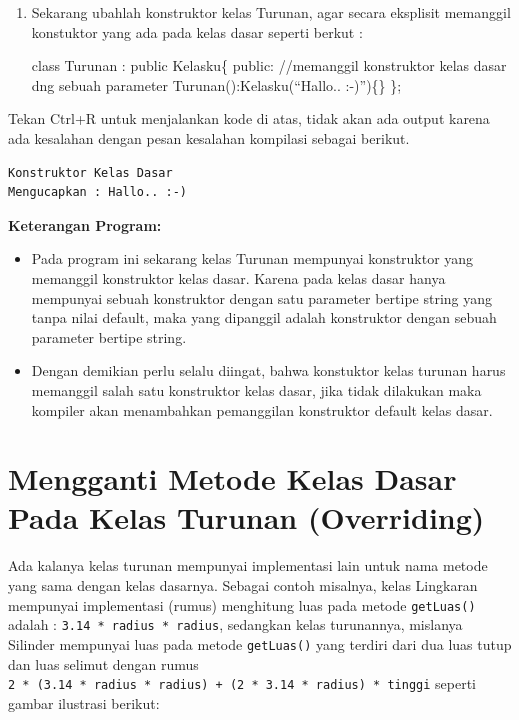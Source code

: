 \begin{enumerate}
\def\labelenumi{\arabic{enumi}.}
\setcounter{enumi}{2}
\item
  Sekarang ubahlah konstruktor kelas Turunan, agar secara eksplisit
  memanggil konstuktor yang ada pada kelas dasar seperti berkut :

  class Turunan : public Kelasku\{ public: //memanggil konstruktor kelas
  dasar dng sebuah parameter Turunan():Kelasku(``Hallo.. :-)'')\{\} \};
\end{enumerate}

Tekan Ctrl+R untuk menjalankan kode di atas, tidak akan ada output
karena ada kesalahan dengan pesan kesalahan kompilasi sebagai berikut.

\begin{verbatim}
Konstruktor Kelas Dasar 
Mengucapkan : Hallo.. :-)
\end{verbatim}
 

\textbf{Keterangan Program:}

\begin{itemize}
\tightlist
\item
  Pada program ini sekarang kelas Turunan mempunyai konstruktor yang
  memanggil konstruktor kelas dasar. Karena pada kelas dasar hanya
  mempunyai sebuah konstruktor dengan satu parameter bertipe string yang
  tanpa nilai default, maka yang dipanggil adalah konstruktor dengan
  sebuah parameter bertipe string.
\item
  Dengan demikian perlu selalu diingat, bahwa konstuktor kelas turunan
  harus memanggil salah satu konstruktor kelas dasar, jika tidak
  dilakukan maka kompiler akan menambahkan pemanggilan konstruktor
  default kelas dasar.
\end{itemize}

\section{Mengganti Metode Kelas Dasar Pada Kelas Turunan
(Overriding)}\label{mengganti-metode-kelas-dasar-pada-kelas-turunan-overriding}

Ada kalanya kelas turunan mempunyai implementasi lain untuk nama metode
yang sama dengan kelas dasarnya. Sebagai contoh misalnya, kelas
Lingkaran mempunyai implementasi (rumus) menghitung luas pada metode
\texttt{getLuas()} adalah : \texttt{3.14\ *\ radius\ *\ radius},
sedangkan kelas turunannya, mislanya Silinder mempunyai luas pada metode
\texttt{getLuas()} yang terdiri dari dua luas tutup dan luas selimut
dengan rumus
\texttt{2\ *\ (3.14\ *\ radius\ *\ radius)\ +\ (2\ *\ 3.14\ *\ radius)\ *\ tinggi}
seperti gambar ilustrasi berikut:

